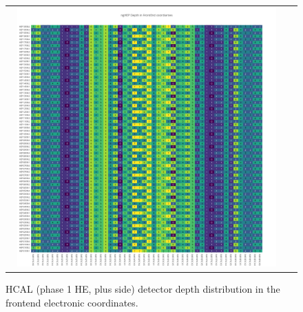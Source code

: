\clearpage
\begin{figure}[htb]
 \begin{center}
  \begin{tabular}{cc}
   \includegraphics[angle=0,width=0.95\textwidth]{figures/appendix/ngHEP_Depth_in_FrontEnd.png}
  \end{tabular}
	\caption{HCAL (phase 1 HE, plus side) detector depth distribution in the frontend electronic coordinates.}
  \label{fig:lmapngHEPDepthFEC}
 \end{center}
\end{figure}

